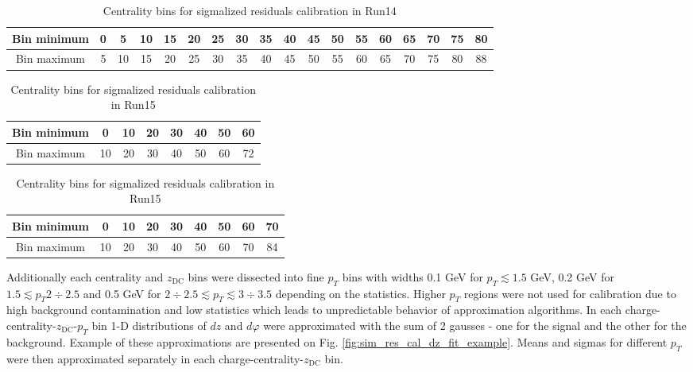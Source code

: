 \begin{table}[h!]
	\centering
	\begin{tabular}{c||c|c|c|c|c|c|c|c|c|c|c|c|c|c|c|c|c}
      Bin minimum & 0 & 5 & 10 & 15 & 20 & 25 & 30 & 35 & 40 & 45 & 50 & 55 & 60 & 65 & 70 & 75 & 80 \\
      \hline
      Bin maximum & 5 & 10 & 15 & 20 & 25 & 30 & 35 & 40 & 45 & 50 & 55 & 60 & 65 & 70 & 75 & 80 & 88 \\
	\end{tabular}
   \caption{Centrality bins for sigmalized residuals calibration in Run14 \HeAu}
	\label{table:sigm_res_cal_centr_bins_run14heau}
\end{table}

\begin{table}[h!]
	\centering
	\begin{tabular}{c||c|c|c|c|c|c|c}
      Bin minimum & 0 & 10 & 20 & 30 & 40 & 50 & 60 \\
      \hline
      Bin maximum & 10 & 20 & 30 & 40 & 50 & 60 & 72 \\
	\end{tabular}
   \caption{Centrality bins for sigmalized residuals calibration in Run15 \pAl}
	\label{table:sigm_res_cal_centr_bins_run15pal}
\end{table}

\begin{table}[h!]
	\centering
	\begin{tabular}{c||c|c|c|c|c|c|c|c}
      Bin minimum & 0 & 10 & 20 & 30 & 40 & 50 & 60 & 70 \\
      \hline
      Bin maximum & 10 & 20 & 30 & 40 & 50 & 60 & 70 & 84 \\
	\end{tabular}
   \caption{Centrality bins for sigmalized residuals calibration in Run15 \pAu}
	\label{table:sigm_res_cal_centr_bins_run15pau}
\end{table}

Additionally each centrality and $z_{\text{DC}}$ bins were dissected into fine $p_T$ bins with widths 0.1 GeV for $p_T \lesssim 1.5$ GeV, 0.2 GeV for $1.5 \lesssim p_T 2 \div 2.5$ and 0.5 GeV for $2 \div 2.5 \lesssim p_T \lesssim 3\div3.5$ depending on the statistics. 
Higher $p_T$ regions were not used for calibration due to high background contamination and low statistics which leads to unpredictable behavior of approximation algorithms. 
In each charge-centrality-$z_{\text{DC}}$-$p_T$ bin 1-D distributions of $dz$ and $d\varphi$ were approximated with the sum of 2 gausses - one for the signal and the other for the background. 
Example of these approximations are presented on Fig. \ref{fig:sim_res_cal_dz_fit_example}. 
Means and sigmas for different $p_T$ were then approximated separately in each charge-centrality-$z_{\text{DC}}$ bin.

